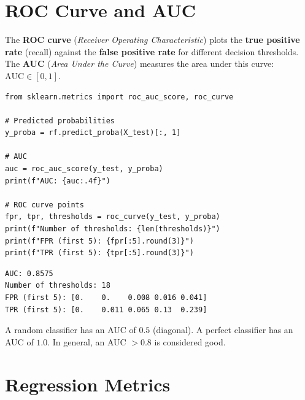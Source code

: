 \section{ROC Curve and AUC}
\label{sec:roc_auc}


\begin{definition}
The \textbf{ROC curve} (\textit{Receiver Operating Characteristic}) plots the \textbf{true positive rate} (recall) against the \textbf{false positive rate} for different decision thresholds. The \textbf{AUC} (\textit{Area Under the Curve}) measures the area under this curve: $\text{AUC} \in [0, 1]$.
\end{definition}

\begin{codeblock}[title=\textbf{Python}]
\begin{verbatim}
from sklearn.metrics import roc_auc_score, roc_curve

# Predicted probabilities
y_proba = rf.predict_proba(X_test)[:, 1]

# AUC
auc = roc_auc_score(y_test, y_proba)
print(f"AUC: {auc:.4f}")

# ROC curve points
fpr, tpr, thresholds = roc_curve(y_test, y_proba)
print(f"Number of thresholds: {len(thresholds)}")
print(f"FPR (first 5): {fpr[:5].round(3)}")
print(f"TPR (first 5): {tpr[:5].round(3)}")
\end{verbatim}
\end{codeblock}

\begin{codeoutput}
\begin{verbatim}
AUC: 0.8575
Number of thresholds: 18
FPR (first 5): [0.    0.    0.008 0.016 0.041]
TPR (first 5): [0.    0.011 0.065 0.13  0.239]
\end{verbatim}
\end{codeoutput}

\begin{remark}
A random classifier has an AUC of $0.5$ (diagonal). A perfect classifier has an AUC of $1.0$. In general, an AUC $> 0.8$ is considered good.
\end{remark}

\section{Regression Metrics}
\label{sec:metriques_regression}


